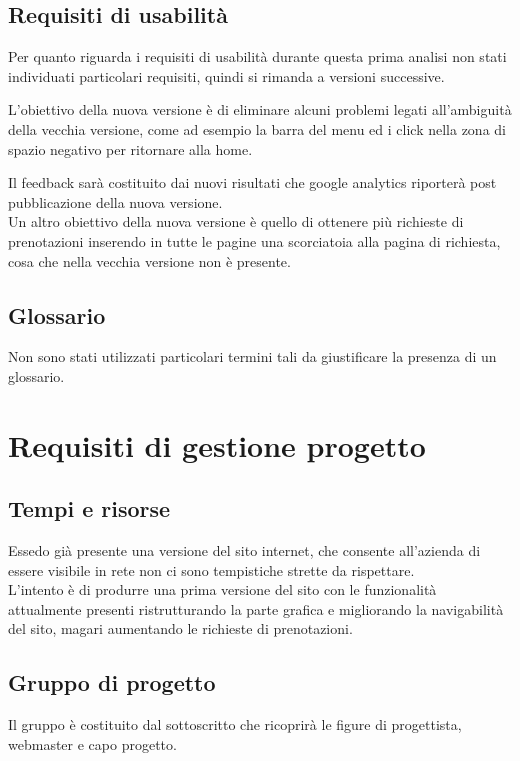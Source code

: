 \documentclass[a4paper,12pt,hidelinks]{report}
\begin{document}
\section{Requisiti di usabilità}
  Per quanto riguarda i requisiti di usabilità durante questa prima analisi non stati individuati particolari requisiti, quindi si rimanda a versioni successive. 
  \par L'obiettivo della nuova versione è di eliminare alcuni problemi legati all'ambiguità della vecchia versione, come ad esempio la barra del menu ed i click nella zona di spazio
  negativo per ritornare alla home. 
  \par Il feedback sarà costituito dai nuovi risultati che google analytics riporterà post pubblicazione della nuova versione.
  \\ Un altro obiettivo della nuova versione è quello di ottenere più richieste di prenotazioni inserendo in tutte le pagine una scorciatoia alla pagina di richiesta,
  cosa che nella vecchia versione non è presente.

\section{Glossario}
  Non sono stati utilizzati particolari termini tali da giustificare la presenza di un glossario.


\chapter{Requisiti di gestione progetto}

\section{Tempi e risorse}
  Essedo già presente una versione del sito internet, che consente all'azienda di essere visibile in rete non ci sono tempistiche strette da rispettare. 
  \\ L'intento è di produrre una prima versione del sito con le funzionalità attualmente presenti ristrutturando la parte grafica e migliorando la navigabilità del sito, 
  magari aumentando le richieste di prenotazioni.

\section{Gruppo di progetto}
  Il gruppo è costituito dal sottoscritto che ricoprirà le figure di progettista, webmaster e capo progetto.
\end{document}
